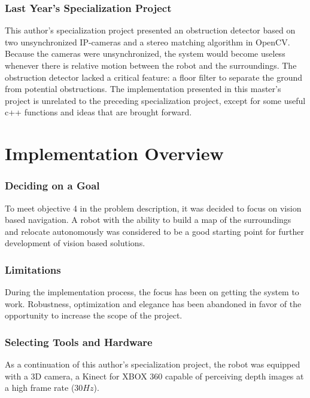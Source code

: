 \subsubsection{Last Year's Specialization Project}

This author's specialization project\cite{lindrup} presented an obstruction detector based on two unsynchronized IP-cameras and a stereo matching algorithm in \ac{OpenCV}. Because the cameras were unsynchronized, the system would become useless whenever there is relative motion between the robot and the surroundings. The obstruction detector lacked a critical feature: a floor filter to separate the ground from potential obstructions. The implementation presented in this master's project is unrelated to the preceding specialization project, except for some useful c++ functions and ideas that are brought forward.

\section{Implementation Overview}

\subsubsection{Deciding on a Goal}

To meet objective 4 in the problem description, it was decided to focus on vision based navigation. A robot with the ability to build a map of the surroundings and relocate autonomously was considered to be a good starting point for further development of vision based solutions.

\subsubsection{Limitations}

During the implementation process, the focus has been on getting the system to work. Robustness, optimization and elegance has been abandoned in favor of the opportunity to increase the scope of the project.

\subsubsection{Selecting Tools and Hardware}

As a continuation of this author's specialization project, the robot was equipped with a 3D camera, a Kinect for XBOX 360 capable of perceiving depth images at a high frame rate ($30 Hz$). 

